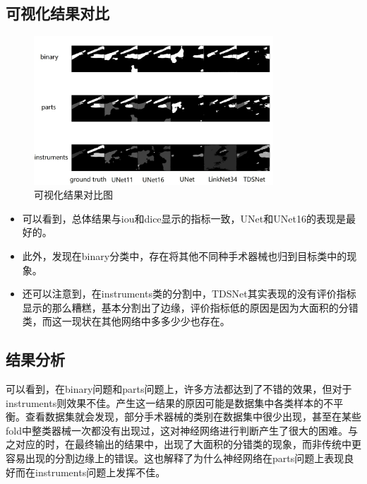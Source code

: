 \documentclass[UTF8]{ctexart}
\begin{document}
  
\subsection{可视化结果对比}

\begin{figure}[H]
    \centering  %
    \includegraphics[width=0.8\textwidth]{figure/visualize.png}
    \caption{可视化结果对比图}
\end{figure}

\begin{itemize}
    \item 可以看到，总体结果与iou和dice显示的指标一致，UNet和UNet16的表现是最好的。
    \item 此外，发现在binary分类中，存在将其他不同种手术器械也归到目标类中的现象。
    \item 还可以注意到，在instruments类的分割中，TDSNet其实表现的没有评价指标显示的那么糟糕，基本分割出了边缘，评价指标低的原因是因为大面积的分错类，而这一现状在其他网络中多多少少也存在。
\end{itemize}

\subsection{结果分析}
可以看到，在binary问题和parts问题上，许多方法都达到了不错的效果，但对于instruments则效果不佳。产生这一结果的原因可能是数据集中各类样本的不平衡。查看数据集就会发现，部分手术器械的类别在数据集中很少出现，甚至在某些fold中整类器械一次都没有出现过，这对神经网络进行判断产生了很大的困难。与之对应的时，在最终输出的结果中，出现了大面积的分错类的现象，而非传统中更容易出现的分割边缘上的错误。这也解释了为什么神经网络在parts问题上表现良好而在instruments问题上发挥不佳。
\end{document}
